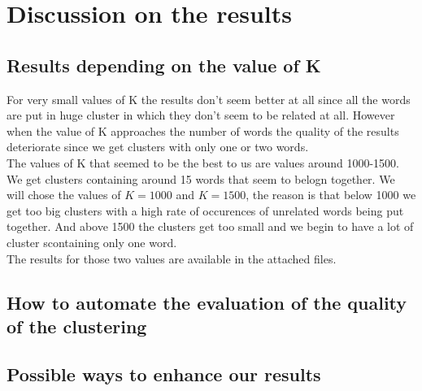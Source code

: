 \documentclass{eplDoc}
\begin{document}
\section{Discussion on the results}

\subsection{Results depending on the value of K}
For very small values of K the results don't seem better at all since all the words are put in huge cluster in which they don't seem to be related at all. However when the value of K approaches the number of words the quality of the results deteriorate since we get clusters with only one or two words. \\ 

The values of K that seemed to be the best to us are values around 1000-1500. We get clusters containing around 15 words that seem to belogn together. We will chose the values of $K=1000$ and $K=1500$, the reason is that below 1000 we get too big clusters with a high rate of occurences of unrelated words being put together. And above 1500 the clusters get too small and we begin to have a lot of cluster scontaining only one word. \\ 
The results for those two values are available in the attached files. 

\subsection{How to automate the evaluation of the quality of the clustering} %


\subsection{Possible ways to enhance our results} %
\end{document}
